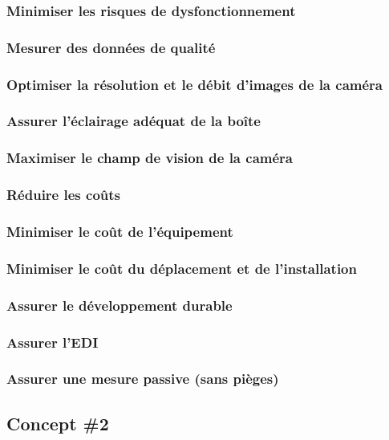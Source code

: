 \subsubsection*{Minimiser les risques de dysfonctionnement}

\subsubsection{Mesurer des données de qualité}
\subsubsection*{Optimiser la résolution et le débit d'images de la caméra}
\subsubsection*{Assurer l'éclairage adéquat de la boîte}
\subsubsection*{Maximiser le champ de vision de la caméra}

\subsubsection{Réduire les coûts}
\subsubsection*{Minimiser le coût de l'équipement}
\subsubsection*{Minimiser le coût du déplacement et de l’installation}

\subsubsection{Assurer le développement durable}
\subsubsection*{Assurer l'EDI}
\subsubsection*{Assurer une mesure passive (sans pièges)}

\subsection{Concept \#2}

